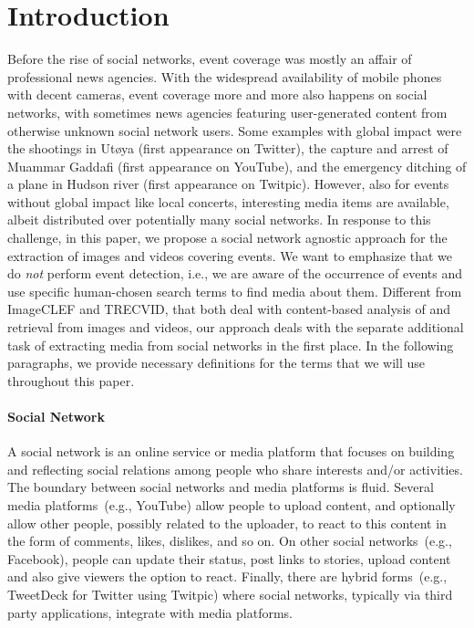 \documentclass{acm_proc_article-sp}
\let\oldemph\emph
\renewcommand{\emph}[1]{\oldemph{\fontsize{9}{9}\selectfont #1}}
\begin{document}
\section{Introduction} \label{sec:introduction}
Before the rise of social networks, event coverage was mostly an affair of professional news agencies.
With the widespread availability of mobile phones with decent cameras,
event coverage more and more also happens on social networks,
with sometimes news agencies featuring user-generated content from otherwise unknown social network users.
Some examples with global impact were the shootings in Ut{\o}ya (first appearance on Twitter), the capture and arrest of Muammar Gaddafi (first appearance on YouTube), and the emergency ditching of a plane in Hudson river (first appearance on Twitpic).
However, also for events without global impact like local concerts,
interesting media items are available,
albeit distributed over potentially many social networks.
In response to this challenge, in this paper, we propose a social network agnostic approach for the extraction of images and videos covering events.
We want to emphasize that we do \emph{not} perform event detection, i.e.,
we are aware of the occurrence of events and use specific human-chosen search terms to find media about them.
Different from \mbox{ImageCLEF} and \mbox{TRECVID}, that both deal with content-based analysis of and retrieval from images and videos,
our approach deals with the separate additional task of extracting media from social networks in the first place.
In the following paragraphs, we provide necessary definitions for the terms that we will use throughout this paper.

\paragraph{Social Network}
A social network is an online service or media platform that focuses on building and reflecting social relations among people who share interests and/or activities.
The boundary between social networks and media platforms is fluid.
Several media platforms~(e.g., YouTube) allow people to upload content,
and optionally allow other people, possibly related to the uploader,
to react to this content in the form of comments, likes, dislikes, and so on.
On other social networks~(e.g., Facebook), people can update their status, post links to stories,
upload content and also give viewers the option to react.
Finally, there are hybrid forms~(e.g., TweetDeck for Twitter using Twitpic) where social networks,
typically via third party applications,
integrate with media platforms.
\end{document}
